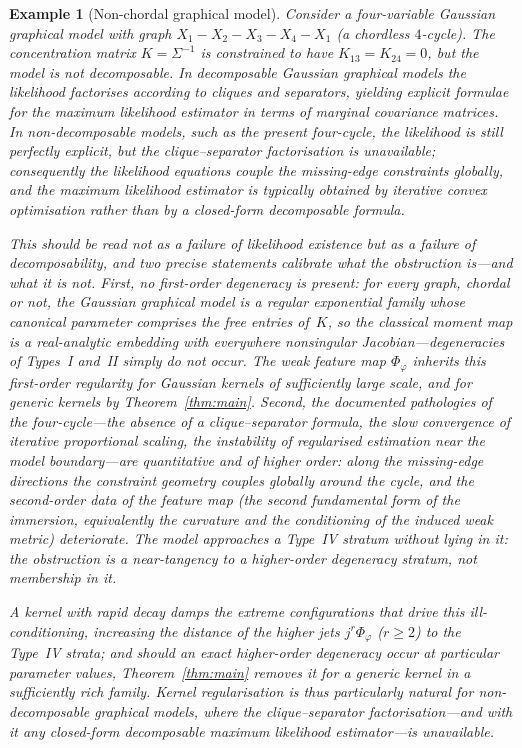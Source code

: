 \documentclass[11pt,a4paper]{article}
\newtheorem{example}[theorem]{Example}
\begin{document}
\begin{example}[Non-chordal graphical model]
\label{ex:graphical}
Consider a four-variable Gaussian graphical model with graph
$X_1\!-\!X_2\!-\!X_3\!-\!X_4\!-\!X_1$ (a chordless $4$-cycle).
The concentration matrix $K = \Sigma^{-1}$ is constrained to have
$K_{13} = K_{24} = 0$, but the model is not decomposable.  In
decomposable Gaussian graphical models the likelihood factorises
according to cliques and separators, yielding explicit formulae for the
maximum likelihood estimator in terms of marginal covariance matrices.
In non-decomposable models, such as the present four-cycle, the
likelihood is still perfectly explicit, but the clique--separator
factorisation is unavailable; consequently the likelihood equations
couple the missing-edge constraints globally, and the maximum likelihood
estimator is typically obtained by iterative convex optimisation rather
than by a closed-form decomposable formula.

This should be read not as a failure of likelihood \emph{existence} but
as a failure of \emph{decomposability}, and two precise statements
calibrate what the obstruction is---and what it is not.  First, no
first-order degeneracy is present: for \emph{every} graph, chordal or
not, the Gaussian graphical model is a regular exponential family
whose canonical parameter comprises the free entries of~$K$, so the
classical moment map is a real-analytic embedding with everywhere
nonsingular Jacobian---degeneracies of Types~I and~II simply do not
occur.  The weak feature map $\Phi_\varphi$ inherits this first-order
regularity for Gaussian kernels of sufficiently large scale, and for
generic kernels by Theorem~\ref{thm:main}.  Second, the documented
pathologies of the four-cycle---the absence of a clique--separator
formula, the slow convergence of iterative proportional scaling, the
instability of regularised estimation near the model boundary---are
quantitative and of higher order: along the missing-edge directions
the constraint geometry couples globally around the cycle, and the
second-order data of the feature map (the second fundamental form of
the immersion, equivalently the curvature and the conditioning of the
induced weak metric) deteriorate.  The model \emph{approaches} a
Type~IV stratum without lying in it: the obstruction is a
near-tangency to a higher-order degeneracy stratum, not membership in
it.

A kernel with rapid decay damps the extreme configurations that drive
this ill-conditioning, increasing the distance of the higher jets
$j^r\Phi_\varphi$ ($r \ge 2$) to the Type~IV strata; and should an
exact higher-order degeneracy occur at particular parameter values,
Theorem~\ref{thm:main} removes it for a generic kernel in a
sufficiently rich family.  Kernel regularisation is thus particularly
natural for non-decomposable graphical models, where the
clique--separator factorisation---and with it any closed-form
decomposable maximum likelihood estimator---is unavailable.
\end{example}
\end{document}
